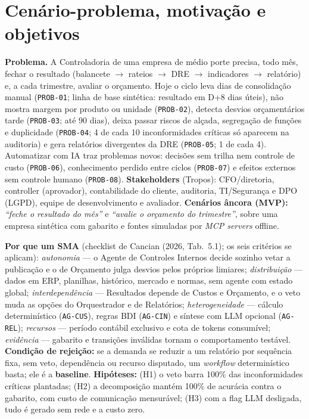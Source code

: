 \documentclass[10pt,a4paper]{article}
\newcommand{\code}[1]{\texttt{#1}}
\begin{document}
\section{Cenário-problema, motivação e objetivos}
\textbf{Problema.} A Controladoria de uma empresa de médio porte precisa, todo mês, fechar o resultado
(balancete $\rightarrow$ rateios $\rightarrow$ DRE $\rightarrow$ indicadores $\rightarrow$ relatório) e, a cada
trimestre, avaliar o orçamento. Hoje o ciclo leva dias de consolidação manual (\code{PROB-01}; linha de base
sintética: resultado em D+8 dias úteis), não mostra margem por produto ou unidade (\code{PROB-02}), detecta desvios
orçamentários tarde (\code{PROB-03}; até 90 dias), deixa passar riscos de alçada, segregação de funções e
duplicidade (\code{PROB-04}; 4 de cada 10 inconformidades críticas só aparecem na auditoria) e gera relatórios
divergentes da DRE (\code{PROB-05}; 1 de cada 4). Automatizar com IA traz problemas novos: decisões sem trilha nem
controle de custo (\code{PROB-06}), conhecimento perdido entre ciclos (\code{PROB-07}) e efeitos externos sem
controle humano (\code{PROB-08}). \textbf{Stakeholders} (Tropos): CFO/diretoria, controller (aprovador),
contabilidade do cliente, auditoria, TI/Segurança e DPO (LGPD), equipe de desenvolvimento e avaliador.
\textbf{Cenários âncora (MVP):} \emph{“feche o resultado do mês”} e \emph{“avalie o orçamento do trimestre”}, sobre
uma empresa sintética com gabarito e fontes simuladas por \emph{MCP servers} offline.

\textbf{Por que um SMA} (checklist de Cancian (2026, Tab.~5.1); os seis critérios se aplicam):
\emph{autonomia} — o Agente de Controles Internos decide sozinho vetar a publicação e o de Orçamento julga desvios
pelos próprios limiares; \emph{distribuição} — dados em ERP, planilhas, histórico, mercado e normas, sem agente com
estado global; \emph{interdependência} — Resultados depende de Custos e Orçamento, e o veto muda as opções do
Orquestrador e de Relatórios; \emph{heterogeneidade} — cálculo determinístico (\code{AG-CUS}), regras BDI
(\code{AG-CIN}) e síntese com LLM opcional (\code{AG-REL}); \emph{recursos} — período contábil exclusivo e cota de
tokens consumível; \emph{evidência} — gabarito e transições inválidas tornam o comportamento testável.
\textbf{Condição de rejeição:} se a demanda se reduzir a um relatório por sequência fixa, sem veto, dependência ou
recurso disputado, um \emph{workflow} determinístico basta; ele é a \textbf{baseline}. \textbf{Hipóteses:} (H1) o
veto barra 100\% das inconformidades críticas plantadas; (H2) a decomposição mantém 100\% de acurácia contra o
gabarito, com custo de comunicação mensurável; (H3) com a flag LLM desligada, tudo é gerado sem rede e a custo zero.
\end{document}
